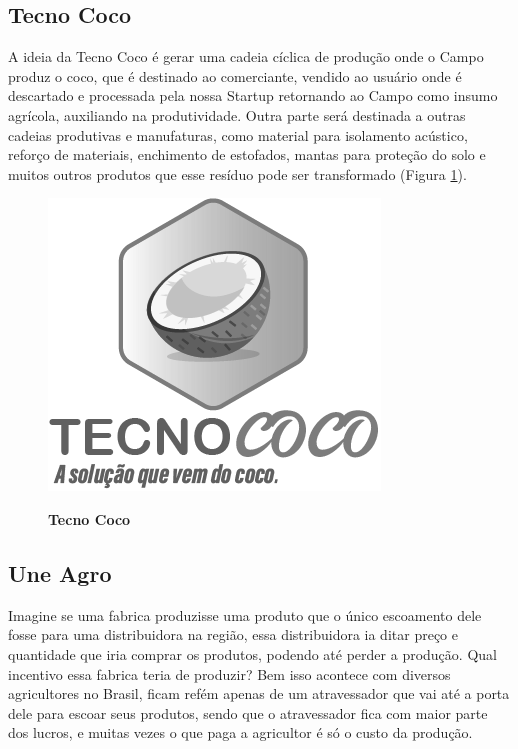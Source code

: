 \subsection{Tecno Coco}

A ideia da Tecno Coco é gerar uma cadeia cíclica de produção onde o Campo produz o coco, que é destinado ao comerciante, vendido ao usuário onde é descartado e processada pela nossa Startup retornando ao Campo como insumo agrícola, auxiliando na produtividade. Outra parte será destinada a outras cadeias produtivas e manufaturas, como material para isolamento acústico, reforço de materiais, enchimento de estofados, mantas para proteção do solo e muitos outros produtos que esse resíduo pode ser transformado (Figura \ref{figura_50}).


\begin{figure}[H]
\centering
\caption{\textbf{Tecno Coco}}
\includegraphics[scale=2.5]{Imagens/tecnococo.png}
\label{figura_50}
\end{figure}


\subsection{Une Agro}

Imagine se uma fabrica produzisse uma produto que o único escoamento dele fosse para uma distribuidora na região, essa distribuidora ia ditar preço e quantidade que iria comprar os produtos, podendo até perder a produção. Qual incentivo essa fabrica teria de produzir? Bem isso acontece com diversos agricultores no Brasil, ficam refém apenas de um atravessador que vai até a porta dele para escoar seus produtos, sendo que o atravessador fica com maior parte dos lucros, e muitas vezes o que paga a agricultor é só o custo da produção.

